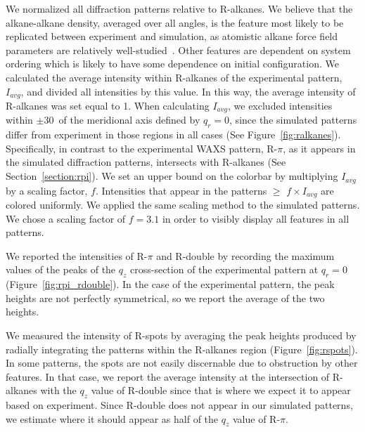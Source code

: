   We normalized all diffraction patterns relative to R-alkanes. We believe that
  the alkane-alkane density, averaged over all angles, is the feature most likely
  to be replicated between experiment and simulation, as atomistic alkane force
  field parameters are relatively well-studied~\cite{wang_development_2004}.
  Other features are dependent on system ordering which is likely to have some
  dependence on initial configuration.  We calculated the average intensity
  within R-alkanes of the experimental pattern, $I_{avg}$, and divided all
  intensities by this value. In this way, the average intensity of R-alkanes was
  set equal to 1. When calculating $I_{avg}$, we excluded intensities within
  $\pm$30\degree~of the meridional axis defined by $q_r=0$, since the simulated
  patterns differ from experiment in those regions in all cases (See
  Figure~\ref{fig:ralkanes}). Specifically, in contrast to the experimental WAXS
  pattern, R-$\pi$, as it appears in the simulated diffraction patterns,
  intersects with R-alkanes (See Section~\ref{section:rpi}). We set an upper bound
  on the colorbar by multiplying $I_{avg}$ by a scaling factor, $f$.  Intensities
  that appear in the patterns $\geq$ $f\times I_{avg}$ are colored uniformly.  We
  applied the same scaling method to the simulated patterns. We chose a scaling
  factor of $f=3.1$ in order to visibly display all features in all patterns.

  We reported the intensities of R-$\pi$ and R-double by recording the maximum values
  of the peaks of the $q_z$ cross-section of the experimental pattern at $q_r=0$ 
  (Figure~\ref{fig:rpi_rdouble}). In the case of the experimental pattern, the peak
  heights are not perfectly symmetrical, so we report the average of the two heights.

  We measured the intensity of R-spots by averaging the peak heights produced
  by radially integrating the patterns within the R-alkanes region
  (Figure~\ref{fig:rspots}). In some patterns, the spots are not easily
  discernable due to obstruction by other features. In that case, we report the
  average intensity at the intersection of R-alkanes with the $q_z$ value of
  R-double since that is where we expect it to appear based on experiment. Since
  R-double does not appear in our simulated patterns, we estimate where it should
  appear as half of the $q_z$ value of R-$\pi$.

